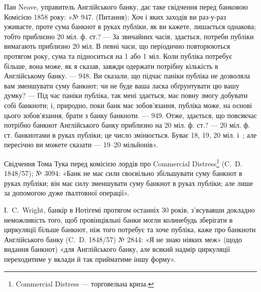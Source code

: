 
Пан Neave, управитель Англійського банку, дає таке свідчення перед
банковою Комісією 1858 року: «№ 947. (Питання): Хоч і яких заходів ви
раз-у-раз уживаєте, проте сума банкнот в руках публіки, як ви кажете,
лишається однакова; тобто приблизно 20 міл. ф. ст.? — За звичайних часів,
здається, потреби публіки вимагають приблизно 20 міл. В певні часи, що періодично
повторюються протягом року, сума та підноситься на 1 або 1 міл.
Коли публіка потребує більше, вона може, як я сказав, завжди одержати
потрібну кількість в Англійському банку. — 948. Ви сказали, що підчас паніки
публіка не дозволяла вам зменшувати суму банкнот; чи не буде ваша ласка
обґрунтувати цю вашу думку? — Під час паніки публіка, так мені здається, має
повну змогу добувати собі банкноти; і, природно, поки банк має зобов’язання,
публіка може, на основі цього зобов’язання, брати з банку банкноти. — 949.
Отже, здається, що повсякчас потрібно банкнот Англійського банку приблизно
на 20 міл. ф. ст.? — 20 міл. ф. ст. банкнотами в руках публіки; це число
змінюється. Буває 18, 19, 20 міл. і~; але пересічно ви можете сказати —
19--20 мільйонів».

Свідчення Тома Тука перед комісією лордів про Commercial Distress\footnote*{
Commercial Distress — торговельна криза. 
}
(C.~D. 1848/57); № 3094: «Банк не має сили своєвільно збільшувати суму
банкнот в руках публіки; він має силу зменшувати суму банкнот в руках
публіки; але лише за допомогою дуже ґвалтовної операції».

І.~C.~Wright, банкір в Нотігемі протягом останніх 30 років, з’ясувавши
докладно неможливість того, щоб провінціяльні банки могли колинебудь зберігати
в циркуляції більше банкнот, ніж того потребує та хоче публіка, каже про банкноти
Англійського банку (C.~D. 1848/57) № 2844: «Я не знаю ніяких меж»
(щодо видання банкнот) «для Англійського банку, але всякий надмір циркуляції
переходитиме у вклади й так прийматиме іншу форму».

